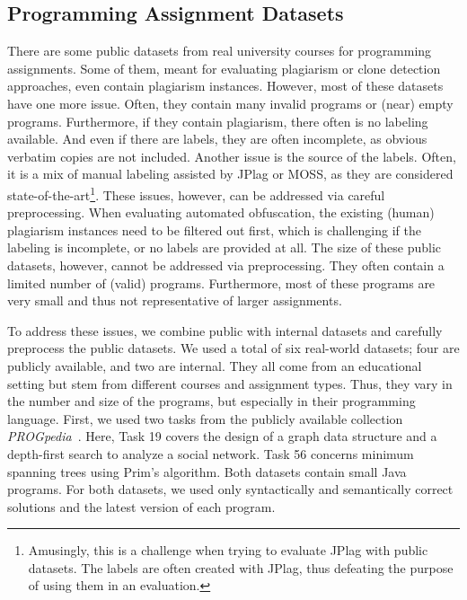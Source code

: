 \subsection{Programming Assignment Datasets}
There are some public datasets from real university courses for programming assignments. Some of them, meant for evaluating plagiarism or clone detection approaches, even contain plagiarism instances.
However, most of these datasets have one more issue. Often, they contain many invalid programs or (near) empty programs. Furthermore, if they contain plagiarism, there often is no labeling available. And even if there are labels, they are often incomplete, as obvious verbatim copies are not included. Another issue is the source of the labels. Often, it is a mix of manual labeling assisted by JPlag or MOSS, as they are considered state-of-the-art\footnote{Amusingly, this is a challenge when trying to evaluate JPlag with public datasets. The labels are often created with JPlag, thus defeating the purpose of using them in an evaluation.}.
These issues, however, can be addressed via careful preprocessing.
When evaluating automated obfuscation, the existing (human) plagiarism instances need to be filtered out first, which is challenging if the labeling is incomplete, or no labels are provided at all.
%
The size of these public datasets, however, cannot be addressed via preprocessing. They often contain a limited number of (valid) programs. Furthermore, most of these programs are very small and thus not representative of larger assignments.

To address these issues, we combine public with internal datasets and carefully preprocess the public datasets.
We used a total of six real-world datasets; four are publicly available, and two are internal. They all come from an educational setting but stem from different courses and assignment types.
Thus, they vary in the number and size of the programs, but especially in their programming language.
First, we used two tasks from the publicly available collection \textit{PROGpedia}~\cite{paiva2023}.
Here, Task 19 covers the design of a graph data structure and a depth-first search to analyze a social network.
Task 56 concerns minimum spanning trees using Prim's algorithm. Both datasets contain small Java programs.
For both datasets, we used only syntactically and semantically correct solutions and the latest version of each program.

